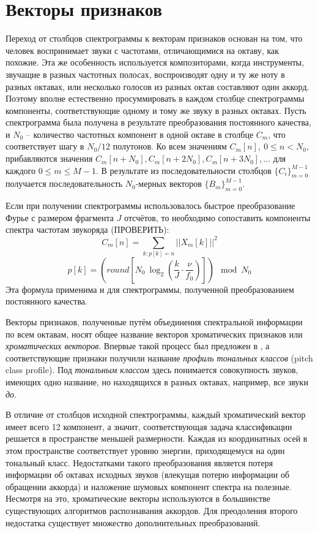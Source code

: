 \section{Векторы признаков} \label{sectL_feat}

Переход от столбцов спектрограммы к векторам признаков основан на том, что
человек воспринимает звуки с частотами, отличающимися на октаву, как похожие.
Эта же особенность используется композиторами, когда инструменты, звучащие в
разных частотных полосах, воспроизводят одну и ту же ноту в разных октавах, или
несколько голосов из разных октав составляют один аккорд. Поэтому вполне
естественно просуммировать в каждом столбце спектрограммы компоненты,
соответствующие одному и тому же звуку в разных октавах. Пусть спектрограмма
была получена в результате преобразования постоянного качества, и $N_0$ --
количество частотных компонент в одной октаве в столбце $C_m$, что
соответствует шагу в $N_0/12$ полутонов. Ко всем значениям $C_m[n], ~ 0 \leq n <
N_0$, прибавляются значения $C_m[n+N_0], C_m[n+2N_0], C_m[n+3N_0], \ldots$ для
каждого $0 \leq m \leq M-1$. В результате из последовательности столбцов
$\{C_i\}_{m=0}^{M-1}$ получается последовательность $N_0$-мерных векторов
$\{B_m\}_{m=0}^{M-1}$.

Если при получении спектрограммы использовалось быстрое преобразование Фурье с
размером фрагмента $J$ отсчётов, то необходимо сопоставить компоненты спектра
частотам звукоряда (ПРОВЕРИТЬ):
\begin{equation}
C_m[n] = \sum_{k: p[k]=n} ||X_m[k]||^2 \label{fft_wrap}
\end{equation}
$$p[k] = \left(round \left[ N_0~\log_2 \left( \frac{k}{J} \cdot \frac{\nu}{f_0}
\right) \right] \right) \mod N_0$$
Эта формула применима и для спектрограммы, полученной преобразованием
постоянного качества.

Векторы признаков, полученные путём объединения спектральной информации по всем
октавам, носят общее название векторов хроматических признаков или
\emph{хроматических векторов}. Впервые такой процесс был предложен в
\cite{Fujishima1999}, а соответствующие признаки получили название
\emph{профиль тональных классов} (pitch class profile). Под \emph{тональным
классом} здесь понимается совокупность звуков, имеющих одно название, но
находящихся в разных октавах, например, все звуки \emph{до}.

В отличие от столбцов исходной спектрограммы, каждый хроматический вектор имеет
всего 12 компонент, а значит, соответствующая задача классификации решается в
пространстве меньшей размерности. Каждая из координатных осей в этом
пространстве соответствует уровню энергии, приходящемуся на один тональный
класс. Недостатками такого преобразования является потеря информации об октавах
исходных звуков (влекущая потерю информации об обращении аккорда) и наложение
шумовых компонент спектра на полезные. Несмотря на это, хроматические векторы
используются в большинстве существующих алгоритмов распознавания аккордов.
Для преодоления второго недостатка существует множество дополнительных
преобразований.

